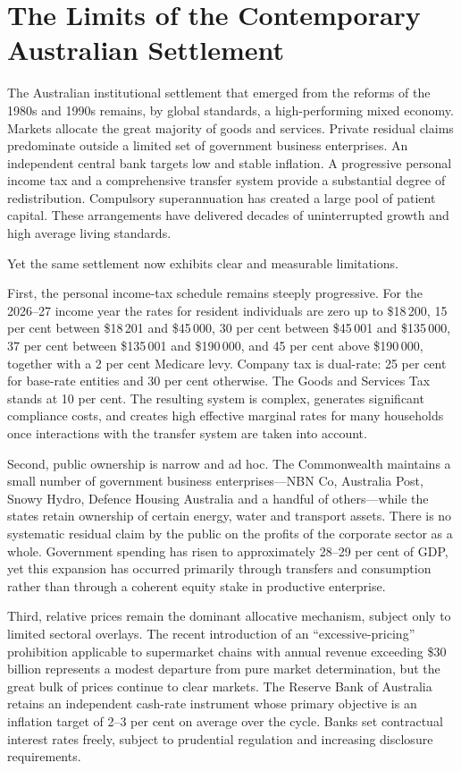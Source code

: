 \documentclass[12pt,anyside]{book}
\theoremstyle{definition}
\theoremstyle{plain}
\theoremstyle{remark}
\begin{document}
\section{The Limits of the Contemporary Australian Settlement}

The Australian institutional settlement that emerged from the reforms of the 1980s and 1990s remains, by global standards, a high-performing mixed economy. Markets allocate the great majority of goods and services. Private residual claims predominate outside a limited set of government business enterprises. An independent central bank targets low and stable inflation. A progressive personal income tax and a comprehensive transfer system provide a substantial degree of redistribution. Compulsory superannuation has created a large pool of patient capital. These arrangements have delivered decades of uninterrupted growth and high average living standards.

Yet the same settlement now exhibits clear and measurable limitations.

First, the personal income-tax schedule remains steeply progressive. For the 2026–27 income year the rates for resident individuals are zero up to \$18\,200, 15 per cent between \$18\,201 and \$45\,000, 30 per cent between \$45\,001 and \$135\,000, 37 per cent between \$135\,001 and \$190\,000, and 45 per cent above \$190\,000, together with a 2 per cent Medicare levy. Company tax is dual-rate: 25 per cent for base-rate entities and 30 per cent otherwise. The Goods and Services Tax stands at 10 per cent. The resulting system is complex, generates significant compliance costs, and creates high effective marginal rates for many households once interactions with the transfer system are taken into account.

Second, public ownership is narrow and ad hoc. The Commonwealth maintains a small number of government business enterprises—NBN Co, Australia Post, Snowy Hydro, Defence Housing Australia and a handful of others—while the states retain ownership of certain energy, water and transport assets. There is no systematic residual claim by the public on the profits of the corporate sector as a whole. Government spending has risen to approximately 28–29 per cent of GDP, yet this expansion has occurred primarily through transfers and consumption rather than through a coherent equity stake in productive enterprise.

Third, relative prices remain the dominant allocative mechanism, subject only to limited sectoral overlays. The recent introduction of an “excessive-pricing” prohibition applicable to supermarket chains with annual revenue exceeding \$30 billion represents a modest departure from pure market determination, but the great bulk of prices continue to clear markets. The Reserve Bank of Australia retains an independent cash-rate instrument whose primary objective is an inflation target of 2–3 per cent on average over the cycle. Banks set contractual interest rates freely, subject to prudential regulation and increasing disclosure requirements.
\end{document}

